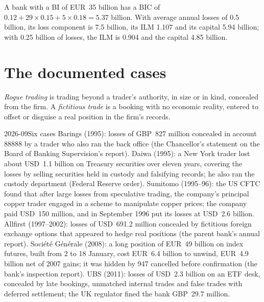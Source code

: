 \begin{example}\label{ex:rc:operational-risk-and-rogue-trading:capital}
A bank with a BI of EUR~35 billion has a BIC of $0.12+29\times0.15+5\times0.18 = 5.37$ billion. With average
annual losses of 0.5 billion, its loss component is 7.5 billion, its ILM 1.107 and its capital 5.94 billion;
with 0.25 billion of losses, the ILM is 0.904 and the capital 4.85 billion.
\end{example}

\section{The documented cases}

\begin{definition}\label{def:rc:operational-risk-and-rogue-trading:rogue}
\emph{Rogue trading} is trading beyond a trader's authority, in size or in kind,
concealed from the firm. A \emph{fictitious trade} is a booking with no economic
reality, entered to offset or disguise a real position in the firm's records.
\end{definition}

\begin{dated}{2026-09}{Six cases}\label{dat:rc:operational-risk-and-rogue-trading:cases}
Barings (1995): losses of GBP~827 million concealed in account 88888 by a trader who also ran the
back office (the Chancellor's statement on the Board of Banking Supervision's report). Daiwa (1995):
a New York trader lost about USD~1.1 billion on Treasury securities over eleven years, covering the
losses by selling securities held in custody and falsifying records; he also ran the custody department
(Federal Reserve order). Sumitomo (1995--96): the US CFTC found that after large losses from
speculative trading, the company's principal copper trader engaged in a scheme to manipulate copper
prices; the company paid USD~150 million, and in September 1996 put its losses at USD~2.6 billion.
Allfirst (1997--2002): losses of USD~691.2 million concealed by fictitious foreign exchange options that
appeared to hedge real positions (the parent bank's annual report). Soci\'et\'e G\'en\'erale (2008): a long
position of EUR~49 billion on index futures, built from 2 to 18 January, cost EUR~6.4 billion to unwind,
EUR~4.9 billion net of 2007 gains; it was hidden by 947  cancelled before confirmation
(the bank's inspection report). UBS (2011): losses of USD~2.3 billion on an ETF desk, concealed by late
bookings, unmatched internal trades and false trades with deferred settlement; the UK regulator fined
the bank GBP~29.7 million.
\end{dated}

